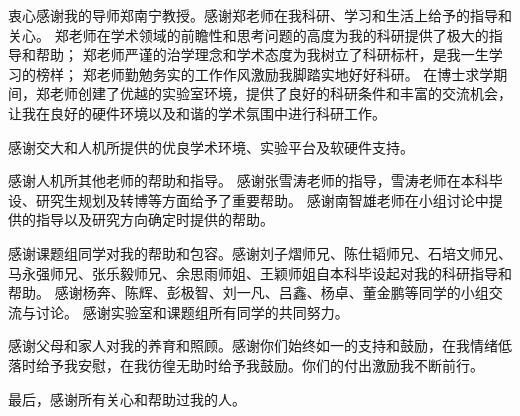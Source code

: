 




衷心感谢我的导师郑南宁教授。感谢郑老师在我科研、学习和生活上给予的指导和关心。
郑老师在学术领域的前瞻性和思考问题的高度为我的科研提供了极大的指导和帮助；
郑老师严谨的治学理念和学术态度为我树立了科研标杆，是我一生学习的榜样；
郑老师勤勉务实的工作作风激励我脚踏实地好好科研。
在博士求学期间，郑老师创建了优越的实验室环境，提供了良好的科研条件和丰富的交流机会，让我在良好的硬件环境以及和谐的学术氛围中进行科研工作。


感谢交大和人机所提供的优良学术环境、实验平台及软硬件支持。

感谢人机所其他老师的帮助和指导。
感谢张雪涛老师的指导，雪涛老师在本科毕设、研究生规划及转博等方面给予了重要帮助。
感谢南智雄老师在小组讨论中提供的指导以及研究方向确定时提供的帮助。

感谢课题组同学对我的帮助和包容。感谢刘子熠师兄、陈仕韬师兄、石培文师兄、马永强师兄、张乐毅师兄、余思雨师姐、王颖师姐自本科毕设起对我的科研指导和帮助。
感谢杨奔、陈辉、彭极智、刘一凡、吕鑫、杨卓、董金鹏等同学的小组交流与讨论。
感谢实验室和课题组所有同学的共同努力。



感谢父母和家人对我的养育和照顾。感谢你们始终如一的支持和鼓励，在我情绪低落时给予我安慰，在我彷徨无助时给予我鼓励。你们的付出激励我不断前行。

最后，感谢所有关心和帮助过我的人。



